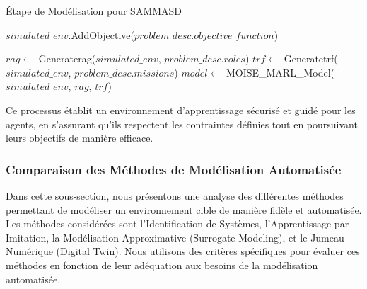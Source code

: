 \documentclass[sigconf,anonymous]{aamas}
\begin{document}
\begin{algorithm}[hbt!]
  \caption{Étape de Modélisation pour SAMMASD}\label{alg:modeling}

  \SetAlgoLined
{}


$simulated\_env$.AddObjective($problem\_desc.objective\_function$)\;

$rag \gets$ Generaterag($simulated\_env$, $problem\_desc.roles$)\;
$trf \gets$ Generatetrf($simulated\_env$, $problem\_desc.missions$)\;
$model \gets$ MOISE\_MARL\_Model($simulated\_env$, $rag$, $trf$)\;


\end{algorithm}


Ce processus établit un environnement d'apprentissage sécurisé et guidé pour les agents, en s'assurant qu'ils respectent les contraintes définies tout en poursuivant leurs objectifs de manière efficace.




\subsubsection{Comparaison des Méthodes de Modélisation Automatisée}

Dans cette sous-section, nous présentons une analyse des différentes méthodes permettant de modéliser un environnement cible de manière fidèle et automatisée. Les méthodes considérées sont l'Identification de Systèmes, l'Apprentissage par Imitation, la Modélisation Approximative (Surrogate Modeling), et le Jumeau Numérique (Digital Twin). Nous utilisons des critères spécifiques pour évaluer ces méthodes en fonction de leur adéquation aux besoins de la modélisation automatisée.
\end{document}
